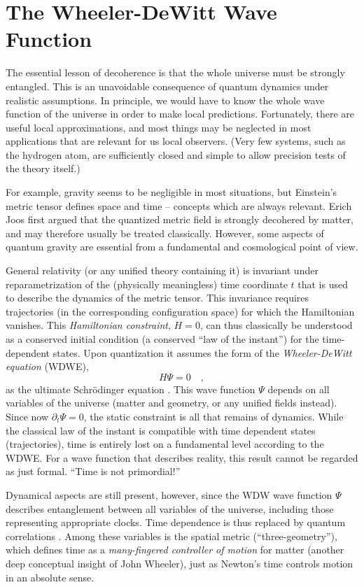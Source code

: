 \documentclass[12pt]{article}
\begin{document}
\section{The Wheeler-DeWitt Wave Function}
The essential lesson of decoherence is that the whole universe
must be strongly entangled. This is an unavoidable
consequence of quantum dynamics under realistic assumptions. In
principle, we would have to know the whole wave function of the
universe in order to make local predictions. Fortunately, there are
useful local approximations, and most things may be neglected in most
applications that are relevant for us local observers. (Very few
systems, such as the hydrogen atom, are sufficiently closed and simple
to allow precision tests of the theory itself.)

For example,  gravity seems to be negligible in most situations, but
Einstein's metric tensor defines space and time -- concepts which are
always relevant. Erich Joos \cite{Joos} first argued that the quantized
metric field is strongly decohered by matter, and may therefore usually
be treated classically. However, some aspects of quantum gravity are
essential from a fundamental and cosmological point of view.

General relativity (or any unified theory containing it) is
invariant under reparametrization of the (physically meaningless) time
coordinate
$t$ that is used to describe the dynamics of the metric tensor. This
invariance requires trajectories (in the corresponding configuration
space) for which the Hamiltonian vanishes. This {\it Hamiltonian
constraint},
$H=0$, can thus classically be understood as a conserved initial
condition (a conserved ``law of the instant'') for the time-dependent
states. Upon quantization it assumes the form of the {\it
Wheeler-DeWitt equation} (WDWE),
$$
H\Psi = 0 \quad ,
$$
as the ultimate
Schr\"odinger equation \cite{DWW}. This wave function $\Psi$ depends on
all variables of the universe (matter and geometry, or any unified
fields instead). Since now $\partial_t \Psi = 0 $, the static
constraint is all that remains of dynamics. While the classical law of
the instant is compatible with time dependent states (trajectories),
time is entirely lost on a fundamental level according to the WDWE.
For a wave function that describes reality, this result cannot be
regarded as just formal. ``Time is not primordial!''
\cite{frontiers}

Dynamical aspects are still present, however, since the WDW wave
function
$\Psi$ describes entanglement between all variables of the universe,
including those representing appropriate clocks. Time dependence is
thus replaced by quantum correlations \cite{PW}. Among these variables
is the spatial metric (``three-geometry''), which defines time as a
{\it many-fingered controller of motion} for matter
\cite{BSW} (another deep conceptual insight of John Wheeler), just as
Newton's time controls motion  in an absolute sense.
\end{document}

